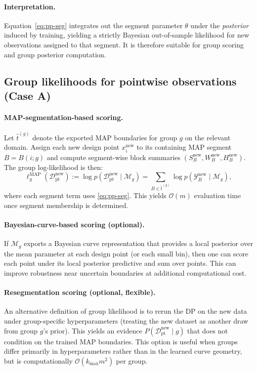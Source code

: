 \paragraph{Interpretation.}
Equation~\eqref{eq:pp-seg} integrates out the segment parameter $\theta$ under the
\emph{posterior} induced by training, yielding a strictly Bayesian out-of-sample likelihood
for new observations assigned to that segment. It is therefore suitable for group scoring
and group posterior computation.

\subsection{Group likelihoods for pointwise observations (Case A)}
\label{sec:group-lik-point}

\paragraph{MAP-segmentation-based scoring.}
Let $\widehat{t}^{(g)}$ denote the exported MAP boundaries for group $g$ on the relevant domain.
Assign each new design point $x_i^{\text{new}}$ to its containing MAP segment $B=B(i;g)$ and
compute segment-wise block summaries $(S_B^{\text{new}},W_B^{\text{new}},H_B^{\text{new}})$.
The group log-likelihood is then:
\begin{equation}
\ell_g^{\text{MAP}}(\mathcal{D}^{\text{new}}_{\text{pt}})
:= \log p(\mathcal{D}^{\text{new}}_{\text{pt}}\mid \mathcal{M}_g)
= \sum_{B\in \widehat{t}^{(g)}} \log p(\mathcal{Y}_B^{\text{new}}\mid \mathcal{M}_g),
\label{eq:group-lik-map}
\end{equation}
where each segment term uses \eqref{eq:pp-seg}. This yields $\mathcal{O}(m)$ evaluation time
once segment membership is determined.

\paragraph{Bayesian-curve-based scoring (optional).}
If $\mathcal{M}_g$ exports a Bayesian curve representation that provides a local posterior over
the mean parameter at each design point (or each small bin), then one can score each point
under its local posterior predictive and sum over points. This can improve robustness near
uncertain boundaries at additional computational cost.

\paragraph{Resegmentation scoring (optional, flexible).}
An alternative definition of group likelihood is to rerun the DP on the new data under
group-specific hyperparameters (treating the new dataset as another draw from group $g$'s
prior). This yields an evidence $P(\mathcal{D}^{\text{new}}_{\text{pt}}\mid g)$ that does not
condition on the trained MAP boundaries. This option is useful when groups differ primarily in
hyperparameters rather than in the learned curve geometry, but is computationally
$\mathcal{O}(k_{\max}m^2)$ per group.

